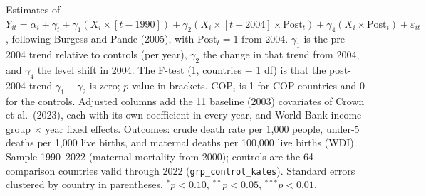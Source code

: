 \begin{table}[htbp]
\begin{minipage}{\textwidth}\footnotesize Estimates of $Y_{it} = \alpha_i + \gamma_t + \gamma_1 (X_i \times [t-1990]) + \gamma_2 (X_i \times [t-2004] \times \mathrm{Post}_t) + \gamma_4 (X_i \times \mathrm{Post}_t) + \varepsilon_{it}$, following Burgess and Pande (2005), with $\mathrm{Post}_t = 1$ from 2004. $\gamma_1$ is the pre-2004 trend relative to controls (per year), $\gamma_2$ the change in that trend from 2004, and $\gamma_4$ the level shift in 2004. The F-test (1, countries $-$ 1 df) is that the post-2004 trend $\gamma_1 + \gamma_2$ is zero; $p$-value in brackets. $\mathrm{COP}_i$ is 1 for COP countries and 0 for the controls. Adjusted columns add the 11 baseline (2003) covariates of Crown et al.\ (2023), each with its own coefficient in every year, and World Bank income group $\times$ year fixed effects. Outcomes: crude death rate per 1,000 people, under-5 deaths per 1,000 live births, and maternal deaths per 100,000 live births (WDI). Sample 1990--2022 (maternal mortality from 2000); controls are the 64 comparison countries valid through 2022 (\texttt{grp\_control\_kates}). Standard errors clustered by country in parentheses. $^{*}p<0.10$, $^{**}p<0.05$, $^{***}p<0.01$.\end{minipage}
\end{table}
